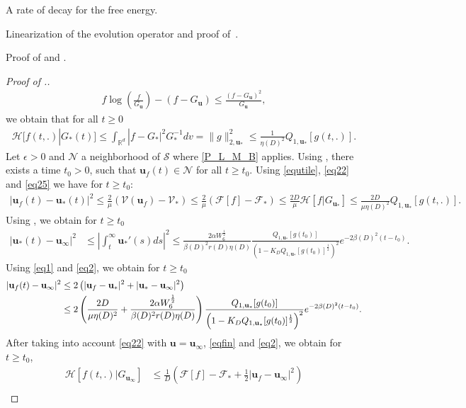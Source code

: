 \documentclass[reqno]{amsart} %
\begin{document}
\begin{section}{A rate of decay for the free energy.}
\begin{section}{Linearization of the evolution operator and proof of~\texorpdfstring{}{thm3}.}
\begin{subsection}{Proof of  \texorpdfstring{}{thme1} and \texorpdfstring{}{thm3}.}
\begin{proof}[Proof of .]
\begin{align*}
        f\log\left(\frac{f}{G_\mathbf{u}}\right)-(f-G_\mathbf{u}) \leq \frac{(f-G_\mathbf{u})^2}{G_\mathbf{u}},
   \end{align*}
   we obtain that for all $t\geq 0$
\begin{align}
\label{eq25}
    \mathcal{H}[f(t,.)|G_{*}(t)] \leq \int_{\mathbb{R}^d}|f-G_{*}|^2G_{*}^{-1}dv=\lVert g \rVert_{2,\mathbf{u}_*}^2 \leq \frac{1}{\eta(D)^2} Q_{1,\mathbf{u}_*}[g(t,.)] .
\end{align}
Let $\epsilon>0$ and $\mathcal{N}$ a neighborhood of $\mathcal{S}$ where \eqref{P_L_M_B} applies.  Using , there exists a time $t_0 >0$, such that $\mathbf{u}_{f}(t) \in\mathcal{N}$ for all $t \geq t_0$. Using \eqref{equtile}, \eqref{eq22}  and \eqref{eq25} we have for $t\geq t_0$:
\begin{align}
\label{eq2}
    |\mathbf{u}_{f}(t)-\mathbf{u}_*(t)|^2 \leq \frac{2}{\mu}(\mathcal{V}(\mathbf{u}_{f})-\mathcal{V}_*)  \leq \frac{2}{\mu}(\mathcal{F}[f]-\mathcal{F}_*) \leq \frac{2D}{\mu}\mathcal{H}[f|G_{\mathbf{u}_*}] \leq \frac{2D}{\mu\eta(D)^2} Q_{1,\mathbf{u}_*}[g(t,.)].
\end{align}
Using , we obtain for $t\geq t_0$
 \begin{align}
    \label{eq1}
         |\mathbf{u}_*(t)-\mathbf{u}_{\infty}|^2&\leq \left|\int_{t}^{\infty}\mathbf{u}_*'(s)ds\right|^2 \leq \frac{ 2\alpha W_6^{\frac{1}{2}}}{\beta(D)^2r(D)  \eta(D)} \frac{Q_{1,\mathbf{u}_*}[g(t_0)]}{\left(1-K_D Q_{1,\mathbf{u}_*}[g(t_0)]^{\frac{1}{2}}\right)^2} e^{-2\beta(D)^2(t-t_0)}.
    \end{align}
 Using \eqref{eq1} and  \eqref{eq2}, we obtain for $ t\geq t_0$
\begin{align}
\label{eqfin}
    |\mathbf{u}_{f}(t)-\mathbf{u}_{\infty}|^2 & \leq 2\left(|\mathbf{u}_{f}-\mathbf{u}_*|^2+|\mathbf{u}_*-\mathbf{u}_{\infty}|^2\right) \notag\\
    & \leq 2\left(\frac{2D}{\mu \eta(D)^2}+\frac{ 2\alpha W_6^{\frac{1}{2}}}{\beta(D)^2r(D)  \eta(D)} \right) \frac{Q_{1,\mathbf{u}_*}[g(t_0)]}{\left(1-K_D Q_{1,\mathbf{u}_*}[g(t_0)]^{\frac{1}{2}}\right)^2} e^{-2\beta(D)^2(t-t_0)}.
\end{align}
After taking into account \eqref{eq22} with $\mathbf{u}=\mathbf{u}_{\infty}$, \eqref{eqfin} and \eqref{eq2}, we obtain for $t\geq t_0$, 
\begin{align*}
    \mathcal{H}[f(t,.)|G_{\mathbf{u}_{\infty}}] &\leq \frac{1}{D}\left(\mathcal{F}[f]-\mathcal{F}_* +\frac{1}{2}|\mathbf{u}_{f}-\mathbf{u}_{\infty}|^2 \right)\\

\end{align*}
\end{proof}
\end{subsection}
\end{section}
\end{section}
\end{document}
